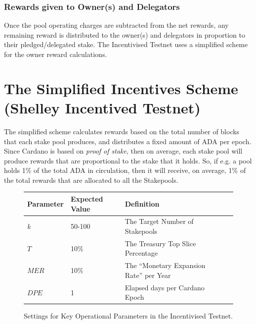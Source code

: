 \documentclass[11pt,a4paper,dvipsnames,twosided,final]{article}
\newcommand{\ada}{ADA{}}
\newcommand{\cardano}[1]{Cardano}
\begin{document}
\subsubsection*{Rewards given to Owner(s) and Delegators}

Once the pool operating charges are subtracted from the net rewards, any remaining reward is distributed to the owner(s) and delegators
in proportion to their pledged/delegated stake.  The Incentivised Testnet uses a simplified scheme for the owner reward calculations.


\clearpage
\section{The Simplified Incentives Scheme (Shelley Incentived Testnet)}
\label{sec:testnet}

The simplified scheme calculates rewards based on the total number of blocks that each stake pool produces,
and distributes a fixed amount of \ada{} per epoch.
Since \cardano{} is based on \emph{proof of stake}, then on average, each stake pool will produce
rewards that are proportional to the stake that it holds.  So, if e.g. a pool holds 1\% of the total
\ada{} in circulation, then it will receive, on average, 1\% of the total rewards that are allocated to all the
Stakepools.

\begin{figure}[h!]
\begin{center}
\begin{tabular}{||l|l|p{10cm}|l||}
  \hline \hline
\textbf{Parameter} & \textbf{Expected Value} & \textbf{Definition} \\\hline
{\color{green} \emph{k}} & {\color{green} 50-100} &{\color{green}  The Target Number of Stakepools} \\\hline
{\color{green} $T$} & {\color{green} 10\%} & {\color{green} The Treasury Top Slice Percentage} \\\hline
{\color{green} $\textit{MER}$} & {\color{green} 10\%}&  {\color{green} The ``Monetary Expansion Rate'' per Year}\\\hline
{\color{green} $\textit{DPE}$} & {\color{green} 1} & {\color{green}  Elapsed days per \cardano{} Epoch} \\\hline
  \hline
\end{tabular}
\end{center}
\caption{Settings for Key Operational Parameters in the Incentivised Testnet.}
\end{figure}
\end{document}
